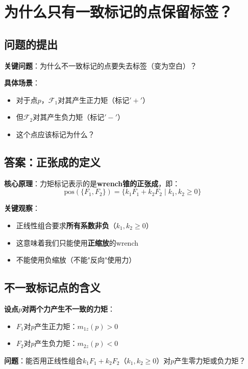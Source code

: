 \documentclass[12pt,a4paper]{article}
\begin{document}
\section{为什么只有一致标记的点保留标签？}

\subsection{问题的提出}

\textbf{关键问题}：为什么不一致标记的点要失去标签（变为空白）？

\textbf{具体场景}：
\begin{itemize}
\item 对于点$p$，$\mathcal{F}_1$对其产生正力矩（标记$'+'$）
\item 但$\mathcal{F}_2$对其产生负力矩（标记$'-'$）
\item 这个点应该标记为什么？
\end{itemize}

\subsection{答案：正张成的定义}

\textbf{核心原理}：力矩标记表示的是\textbf{wrench锥的正张成}，即：
\begin{equation}
\text{pos}(\{F_1, F_2\}) = \{k_1 F_1 + k_2 F_2 \mid k_1, k_2 \geq 0\}
\end{equation}

\textbf{关键观察}：
\begin{itemize}
\item 正线性组合要求\textbf{所有系数非负}（$k_1, k_2 \geq 0$）
\item 这意味着我们只能使用\textbf{正缩放}的wrench
\item 不能使用负缩放（不能"反向"使用力）
\end{itemize}

\subsection{不一致标记点的含义}

\textbf{设点$p$对两个力产生不一致的力矩}：
\begin{itemize}
\item $F_1$对$p$产生正力矩：$m_{1z}(p) > 0$
\item $F_2$对$p$产生负力矩：$m_{2z}(p) < 0$
\end{itemize}

\textbf{问题}：能否用正线性组合$k_1 F_1 + k_2 F_2$（$k_1, k_2 \geq 0$）对$p$产生零力矩或负力矩？
\end{document}
